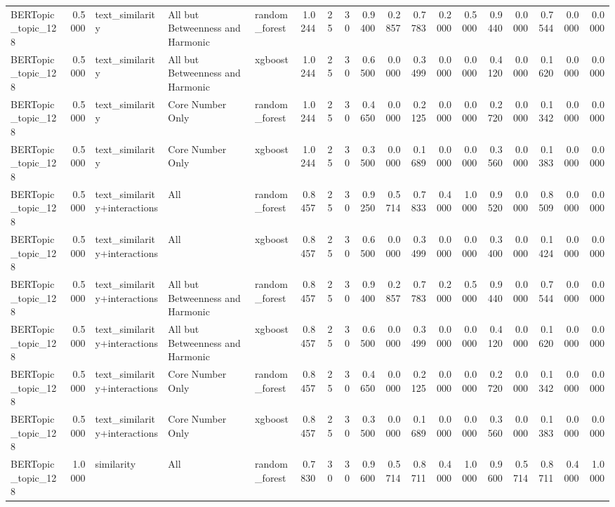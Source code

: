 \begin{tabular}{lrlllrrrrrrrrrrrrr}
BERTopic_topic_128 & 0.5000 & text_similarity & All but Betweenness and Harmonic & random_forest & 1.0244 & 25 & 30 & 0.9400 & 0.2857 & 0.7783 & 0.2000 & 0.5000 & 0.9440 & 0.0000 & 0.7544 & 0.0000 & 0.0000 \\
BERTopic_topic_128 & 0.5000 & text_similarity & All but Betweenness and Harmonic & xgboost & 1.0244 & 25 & 30 & 0.6500 & 0.0000 & 0.3499 & 0.0000 & 0.0000 & 0.4120 & 0.0000 & 0.1620 & 0.0000 & 0.0000 \\
BERTopic_topic_128 & 0.5000 & text_similarity & Core Number Only & random_forest & 1.0244 & 25 & 30 & 0.4650 & 0.0000 & 0.2125 & 0.0000 & 0.0000 & 0.2720 & 0.0000 & 0.1342 & 0.0000 & 0.0000 \\
BERTopic_topic_128 & 0.5000 & text_similarity & Core Number Only & xgboost & 1.0244 & 25 & 30 & 0.3500 & 0.0000 & 0.1689 & 0.0000 & 0.0000 & 0.3560 & 0.0000 & 0.1383 & 0.0000 & 0.0000 \\
BERTopic_topic_128 & 0.5000 & text_similarity+interactions & All & random_forest & 0.8457 & 25 & 30 & 0.9250 & 0.5714 & 0.7833 & 0.4000 & 1.0000 & 0.9520 & 0.0000 & 0.8509 & 0.0000 & 0.0000 \\
BERTopic_topic_128 & 0.5000 & text_similarity+interactions & All & xgboost & 0.8457 & 25 & 30 & 0.6500 & 0.0000 & 0.3499 & 0.0000 & 0.0000 & 0.3400 & 0.0000 & 0.1424 & 0.0000 & 0.0000 \\
BERTopic_topic_128 & 0.5000 & text_similarity+interactions & All but Betweenness and Harmonic & random_forest & 0.8457 & 25 & 30 & 0.9400 & 0.2857 & 0.7783 & 0.2000 & 0.5000 & 0.9440 & 0.0000 & 0.7544 & 0.0000 & 0.0000 \\
BERTopic_topic_128 & 0.5000 & text_similarity+interactions & All but Betweenness and Harmonic & xgboost & 0.8457 & 25 & 30 & 0.6500 & 0.0000 & 0.3499 & 0.0000 & 0.0000 & 0.4120 & 0.0000 & 0.1620 & 0.0000 & 0.0000 \\
BERTopic_topic_128 & 0.5000 & text_similarity+interactions & Core Number Only & random_forest & 0.8457 & 25 & 30 & 0.4650 & 0.0000 & 0.2125 & 0.0000 & 0.0000 & 0.2720 & 0.0000 & 0.1342 & 0.0000 & 0.0000 \\
BERTopic_topic_128 & 0.5000 & text_similarity+interactions & Core Number Only & xgboost & 0.8457 & 25 & 30 & 0.3500 & 0.0000 & 0.1689 & 0.0000 & 0.0000 & 0.3560 & 0.0000 & 0.1383 & 0.0000 & 0.0000 \\
BERTopic_topic_128 & 1.0000 & similarity & All & random_forest & 0.7830 & 30 & 30 & 0.9600 & 0.5714 & 0.8711 & 0.4000 & 1.0000 & 0.9600 & 0.5714 & 0.8711 & 0.4000 & 1.0000 \\

\end{tabular}
